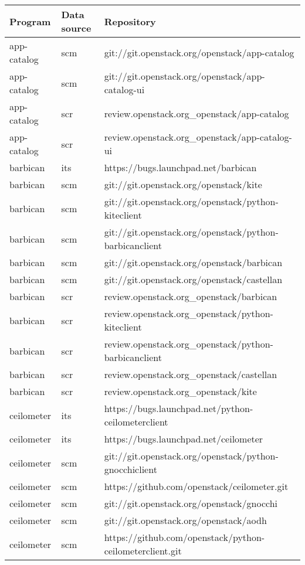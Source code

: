 \begin{center}                                                                       
\begin{longtable}{|p{4cm}|p{1cm}|p{10cm}|}
\hline
Program & Data source & Repository \\
\hline

app-catalog&scm&git://git.openstack.org/openstack/app-catalog\\ 
app-catalog&scm&git://git.openstack.org/openstack/app-catalog-ui\\ 
app-catalog&scr&review.openstack.org\_openstack/app-catalog\\ 
app-catalog&scr&review.openstack.org\_openstack/app-catalog-ui\\ 
barbican&its&https://bugs.launchpad.net/barbican\\ 
barbican&scm&git://git.openstack.org/openstack/kite\\ 
barbican&scm&git://git.openstack.org/openstack/python-kiteclient\\ 
barbican&scm&git://git.openstack.org/openstack/python-barbicanclient\\ 
barbican&scm&git://git.openstack.org/openstack/barbican\\ 
barbican&scm&git://git.openstack.org/openstack/castellan\\ 
barbican&scr&review.openstack.org\_openstack/barbican\\ 
barbican&scr&review.openstack.org\_openstack/python-kiteclient\\ 
barbican&scr&review.openstack.org\_openstack/python-barbicanclient\\ 
barbican&scr&review.openstack.org\_openstack/castellan\\ 
barbican&scr&review.openstack.org\_openstack/kite\\ 
ceilometer&its&https://bugs.launchpad.net/python-ceilometerclient\\ 
ceilometer&its&https://bugs.launchpad.net/ceilometer\\ 
ceilometer&scm&git://git.openstack.org/openstack/python-gnocchiclient\\ 
ceilometer&scm&https://github.com/openstack/ceilometer.git\\ 
ceilometer&scm&git://git.openstack.org/openstack/gnocchi\\ 
ceilometer&scm&git://git.openstack.org/openstack/aodh\\ 
ceilometer&scm&https://github.com/openstack/python-ceilometerclient.git\\ 

\end{longtable}
\end{center}
